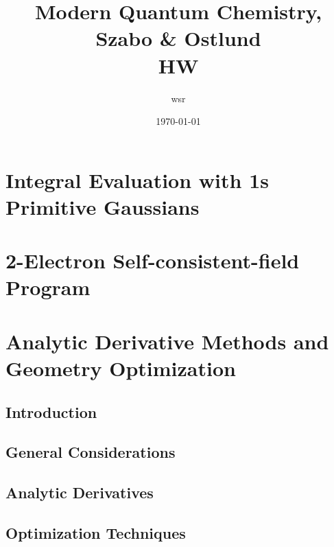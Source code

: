 \documentclass[a4paper]{article}
\title{\textbf{Modern Quantum Chemistry, Szabo \& Ostlund}\\HW}
\author{wsr
\vspace{5pt}\\
}
\date{\today} %
\begin{document}

\maketitle

\tableofcontents

\newpage


\section{Integral Evaluation with 1s Primitive Gaussians}

\section{2-Electron Self-consistent-field Program}

\section{Analytic Derivative Methods and Geometry Optimization}
\subsection{Introduction}

\subsection{General Considerations}

\subsection{Analytic Derivatives}

\subsection{Optimization Techniques}
\end{document}
